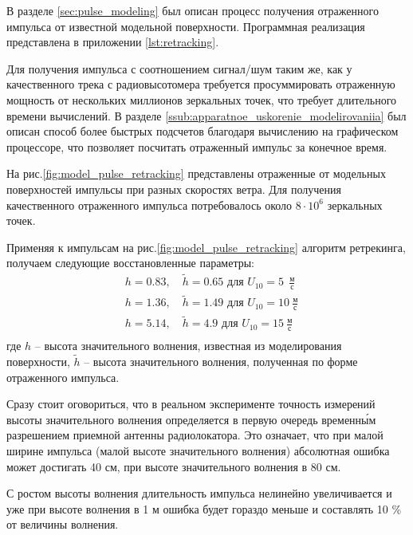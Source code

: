 В разделе \ref{sec:pulse_modeling} был описан процесс получения отраженного
импульса от известной модельной поверхности. 
Программная реализация
представлена в приложении \ref{lst:retracking}. 

Для получения импульса с соотношением сигнал/шум  таким же, как у качественного
трека с радиовысотомера требуется просуммировать отраженную мощность от
нескольких миллионов зеркальных точек, что требует длительного времени
вычислений. В разделе \ref{ssub:apparatnoe_uskorenie_modelirovaniia} был описан
способ более быстрых подсчетов благодаря вычислению на графическом процессоре,
что позволяет посчитать отраженный импульс за конечное время. 

На рис.\ref{fig:model_pulse_retracking} представлены отраженные от модельных
поверхностей импульсы при разных скоростях ветра. Для получения качественного
отраженного импульса потребовалось около $8\cdot 10^{6}$ зеркальных точек.

Применяя к импульсам на рис.\ref{fig:model_pulse_retracking} алгоритм
ретрекинга, получаем следующие восстановленные параметры:
\begin{align}
    \label{eq:retracking}
    & h = 0.83, \quad \tilde h = 0.65 \text{ для } U_{10} = 5~~\frac{\text{м}}{\text{с}}\\
    & h = 1.36, \quad \tilde h = 1.49 \text{ для } U_{10} = 10~\frac{\text{м}}{\text{с}}\\
    & h = 5.14, \quad \tilde h = 4.9  \text{ для } U_{10} = 15~\frac{\text{м}}{\text{с}}\\
\end{align}
где $h$ -- высота значительного волнения, известная из моделирования
поверхности, $\tilde h$ -- высота значительного волнения, полученная по форме
отраженного импульса.  

Сразу стоит оговориться, что в реальном эксперименте точность измерений высоты
значительного волнения определяется в первую очередь временн\'{ы}м разрешением
приемной антенны радиолокатора. Это означает, что при малой ширине импульса
(малой высоте значительного волнения) абсолютная ошибка может достигать 40 см, при высоте значительного волнения в 80 см. 

С ростом высоты волнения длительность импульса нелинейно увеличивается и уже
при высоте волнения в 1 м ошибка будет гораздо меньше и составлять 10 \%
от величины волнения.


